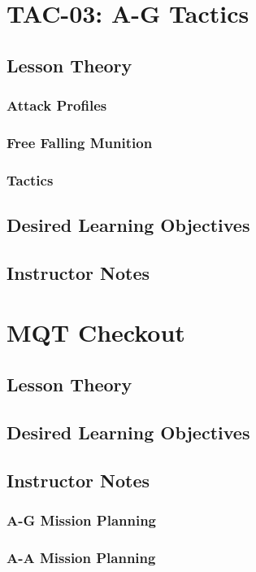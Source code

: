  \chapter{TAC-03: A-G Tactics}
    \section{Lesson Theory}
      \subsection{Attack Profiles}
      \subsection{Free Falling Munition}
      \subsection{Tactics}
    \section{Desired Learning Objectives}
    \section{Instructor Notes}

  \chapter{MQT Checkout}
  \section{Lesson Theory}
  \section{Desired Learning Objectives}
  \section{Instructor Notes}
    \subsection{A-G Mission Planning}
    \subsection{A-A Mission Planning}